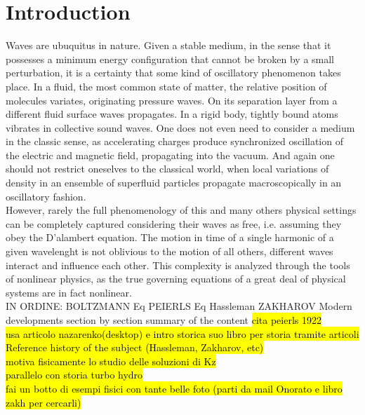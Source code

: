 

\newpage
\vphantom{}
\section*{Introduction}
    
    Waves are ubuquitus in nature. Given a stable medium, in the sense that it possesses a minimum energy configuration that cannot be broken by a small perturbation, it is a certainty that some kind of oscillatory phenomenon takes place. In a fluid, the most common state of matter, the relative position of molecules variates, originating pressure waves. On its separation layer from a different fluid surface waves propagates. In a rigid body, tightly bound atoms vibrates in collective sound waves. One does not even need to consider a medium in the classic sense, as accelerating charges produce synchronized oscillation of the electric and magnetic field, propagating into the vacuum. And again one should not restrict oneselves to the classical world, when local variations of density in an ensemble of superfluid particles propagate macroscopically in an oscillatory fashion. \\
    However, rarely the full phenomenology of this and many others physical settings can be completely captured considering their waves as free, i.e. assuming they obey the D'alambert equation. The motion in time of a single harmonic of a given wavelenght is not oblivious to the motion of all others, different waves interact and influence each other. This complexity is analyzed through the tools of nonlinear physics, as the true governing equations of a great deal of physical systems are in fact nonlinear. \\
    IN ORDINE:
    BOLTZMANN Eq
    PEIERLS Eq
    Hassleman
    ZAKHAROV
    Modern developments
    section by section summary of the content
    \hl{
    cita peierls 1922 \\
    usa articolo nazarenko(desktop) e intro storica suo libro per storia tramite articoli\\
    Reference history of the subject (Hassleman, Zakharov, etc)\\
    motiva fisicamente lo studio delle soluzioni di Kz\\
    parallelo con storia turbo hydro\\
    fai un botto di esempi fisici con tante belle foto (parti da mail Onorato e libro zakh per cercarli)\\
    }

